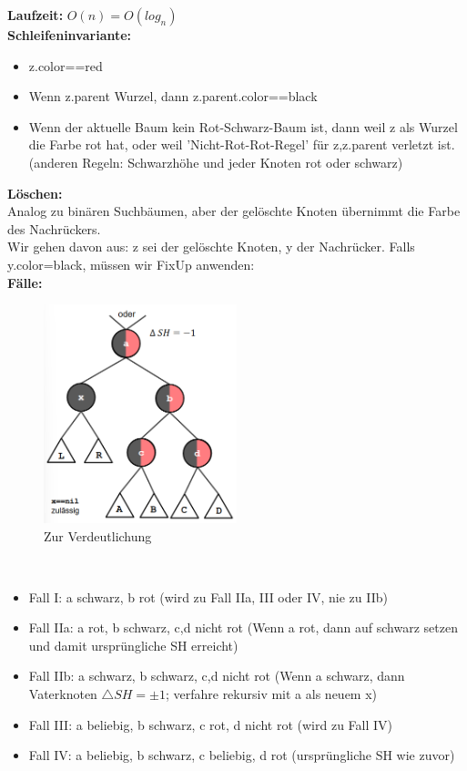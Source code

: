 \documentclass{article}
\begin{document}
            \textbf{Laufzeit:} $O(n)=O(log_n)$\\
            \textbf{Schleifeninvariante:}
            \begin{itemize}
                \item z.color==red
                \item Wenn z.parent Wurzel, dann z.parent.color==black
                \item Wenn der aktuelle Baum kein Rot-Schwarz-Baum ist, dann weil z als Wurzel die Farbe rot hat, oder weil 'Nicht-Rot-Rot-Regel' für z,z.parent verletzt ist. (anderen Regeln: Schwarzhöhe und jeder Knoten rot oder schwarz)
            \end{itemize}

            \textbf{Löschen:}\\
            Analog zu binären Suchbäumen, aber der gelöschte Knoten übernimmt die Farbe des Nachrückers. \\
            Wir gehen davon aus: z sei der gelöschte Knoten, y der Nachrücker. Falls y.color=black, müssen wir FixUp anwenden:\\
            \textbf{Fälle:}\\
            \begin{figure}[ht]
                \centering
                \includegraphics[width=0.5\textwidth]{Bilder/RSFixup.png}
                \caption{Zur Verdeutlichung}
                \label{fig:RSFixup}
            \end{figure}\\
            \newpage
            \begin{itemize}
                \item Fall I: a schwarz, b rot (wird zu Fall IIa, III oder IV, nie zu IIb)
                \item Fall IIa: a rot, b schwarz, c,d nicht rot (Wenn a rot, dann auf schwarz setzen und damit ursprüngliche SH erreicht)
                \item Fall IIb: a schwarz, b schwarz, c,d nicht rot (Wenn a schwarz, dann Vaterknoten $\triangle SH = \pm 1$; verfahre rekursiv mit a als neuem x)
                \item Fall III: a beliebig, b schwarz, c rot, d nicht rot (wird zu Fall IV)
                \item Fall IV: a beliebig, b schwarz, c beliebig, d rot (ursprüngliche SH wie zuvor)
            \end{itemize}
\end{document}
